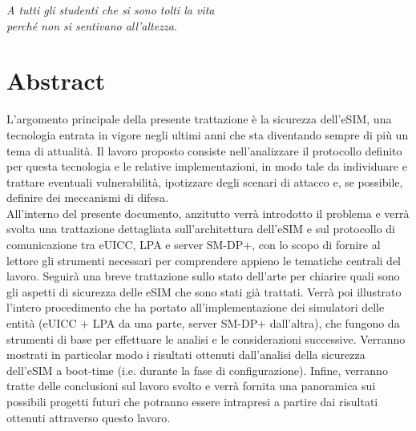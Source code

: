 \documentclass[10pt, oneside]{book}
\begin{document}
\begin{frontespizio}
\end{frontespizio}

\begin{flushright}
\null{}
\textit{A tutti gli studenti che si sono tolti la vita\\perché non si sentivano all'altezza.}
\null
\end{flushright}

\chapter*{Abstract}
L'argomento principale della presente trattazione è la sicurezza dell'eSIM, una tecnologia entrata in vigore negli ultimi anni che sta diventando sempre di più un tema di attualità. Il lavoro proposto consiste nell'analizzare il protocollo definito per questa tecnologia e le relative implementazioni, in modo tale da individuare e trattare eventuali vulnerabilità, ipotizzare degli scenari di attacco e, se possibile, definire dei meccanismi di difesa.\\
All'interno del presente documento, anzitutto verrà introdotto il problema e verrà svolta una trattazione dettagliata sull'architettura dell'eSIM e sul protocollo di comunicazione tra eUICC, LPA e server SM-DP+, con lo scopo di fornire al lettore gli strumenti necessari per comprendere appieno le tematiche centrali del lavoro. Seguirà una breve trattazione sullo stato dell'arte per chiarire quali sono gli aspetti di sicurezza delle eSIM che sono stati già trattati. Verrà poi illustrato l'intero procedimento che ha portato all'implementazione dei simulatori delle entità (eUICC + LPA da una parte, server SM-DP+ dall'altra), che fungono da strumenti di base per effettuare le analisi e le considerazioni successive. Verranno mostrati in particolar modo i risultati ottenuti dall'analisi della sicurezza dell'eSIM a boot-time (i.e. durante la fase di configurazione). Infine, verranno tratte delle conclusioni sul lavoro svolto e verrà fornita una panoramica sui possibili progetti futuri che potranno essere intrapresi a partire dai risultati ottenuti attraverso questo lavoro.
\end{document}
